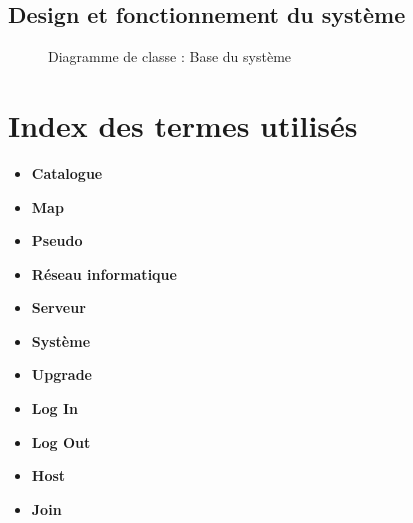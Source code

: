 \documentclass[a4paper,11pt]{report}
\begin{document}
\section{Design et fonctionnement du système}
\begin{figure}[ht]
    \caption{Diagramme de classe : Base du système}
\end{figure}


\newpage
\chapter{Index des termes utilisés}
\begin{itemize}
 \item \textbf{Catalogue}
 \item \textbf{Map}
 \item \textbf{Pseudo}
 \item \textbf{Réseau informatique}
 \item \textbf{Serveur}
 \item \textbf{Système}
 \item \textbf{Upgrade}
 \item \textbf{Log In}
 \item \textbf{Log Out}
 \item \textbf{Host}
 \item \textbf{Join}
\end{itemize}
\end{document}
